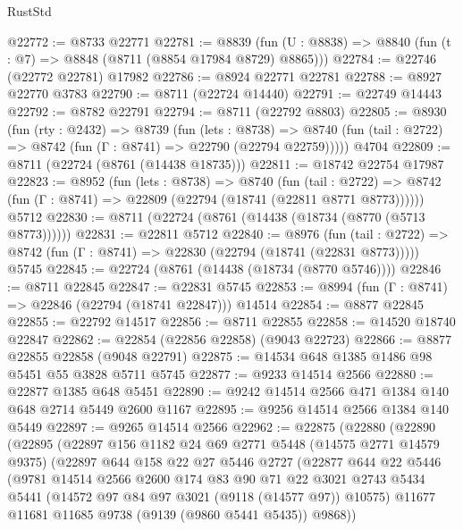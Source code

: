 \begin{lexlean}{RustStd}
\begin{coremodule}
@22772 := @8733 @22771
@22781 := @8839
    (fun (U : @8838) => @8840 (fun (t : @7) => @8848 (@8711 (@8854 @17984 @8729) @8865)))
@22784 := @22746 (@22772 @22781) @17982
@22786 := @8924 @22771 @22781
@22788 := @8927 @22770 @3783
@22790 := @8711 (@22724 @14440)
@22791 := @22749 @14443
@22792 := @8782 @22791
@22794 := @8711 (@22792 @8803)
@22805 := @8930
    (fun (rty : @2432) =>
    @8739
      (fun (lets : @8738) =>
      @8740 (fun (tail : @2722) => @8742 (fun (Γ : @8741) => @22790 (@22794 @22759)))))
    @4704
@22809 := @8711 (@22724 (@8761 (@14438 @18735)))
@22811 := @18742 @22754 @17987
@22823 := @8952
    (fun (lets : @8738) =>
    @8740
      (fun (tail : @2722) =>
      @8742 (fun (Γ : @8741) => @22809 (@22794 (@18741 (@22811 @8771 @8773))))))
    @5712
@22830 := @8711 (@22724 (@8761 (@14438 (@18734 (@8770 (@5713 @8773))))))
@22831 := @22811 @5712
@22840 := @8976
    (fun (tail : @2722) => @8742 (fun (Γ : @8741) => @22830 (@22794 (@18741 (@22831 @8773)))))
    @5745
@22845 := @22724 (@8761 (@14438 (@18734 (@8770 @5746))))
@22846 := @8711 @22845
@22847 := @22831 @5745
@22853 := @8994 (fun (Γ : @8741) => @22846 (@22794 (@18741 @22847))) @14514
@22854 := @8877 @22845
@22855 := @22792 @14517
@22856 := @8711 @22855
@22858 := @14520 @18740 @22847
@22862 := @22854 (@22856 @22858) (@9043 @22723)
@22866 := @8877 @22855 @22858 (@9048 @22791)
@22875 := @14534 @648 @1385 @1486 @98 @5451 @55 @3828 @5711 @5745
@22877 := @9233 @14514 @2566
@22880 := @22877 @1385 @648 @5451
@22890 := @9242 @14514 @2566 @471 @1384 @140 @648 @2714 @5449 @2600 @1167
@22895 := @9256 @14514 @2566 @1384 @140 @5449
@22897 := @9265 @14514 @2566
@22962 := @22875
    (@22880
      (@22890
        (@22895
          (@22897
            @156
            @1182
            @24
            @69
            @2771
            @5448
            (@14575 @2771 @14579 @9375)
            (@22897
              @644
              @158
              @22
              @27
              @5446
              @2727
              (@22877
                @644
                @22
                @5446
                (@9781
                  @14514
                  @2566
                  @2600
                  @174
                  @83
                  @90
                  @71
                  @22
                  @3021
                  @2743
                  @5434
                  @5441
                  (@14572 @97 @84 @97 @3021 (@9118 (@14577 @97)) @10575)
                  @11677
                  @11681
                  @11685
                  @9738
                  (@9139 (@9860 @5441 @5435))
                  @9868))

\end{coremodule}
\end{lexlean}
